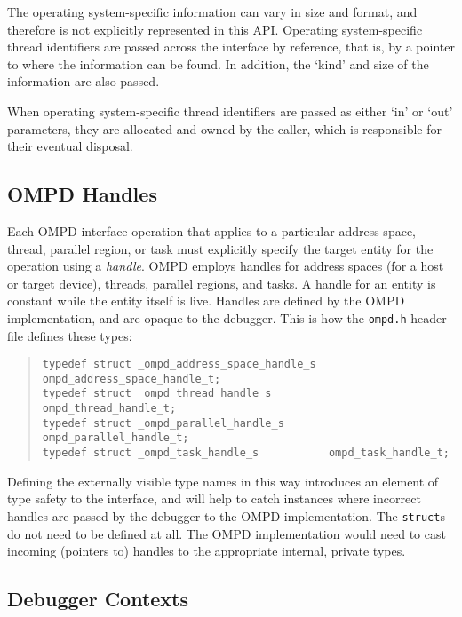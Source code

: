 The operating system-specific information can vary in size
and format, and therefore is not explicitly represented in this API.
Operating system-specific thread identifiers are passed
across the interface by reference, that is, by a pointer
to where the information can be found.
In addition, the `kind' and size of the information are
also passed.

When operating system-specific thread identifiers are
passed as either `in' or `out' parameters, they are
allocated and owned by the caller, which is responsible
for their eventual disposal.

\subsection{OMPD Handles}
\label{ompd-handles:sec}

Each OMPD interface operation that applies to a particular address space,
thread, parallel region, or task must  explicitly specify the target entity
for the operation using a \emph{handle}.
OMPD employs handles for address spaces (for a host or target device),
threads, parallel regions, and tasks.
A handle for an entity is constant while the entity itself is live.
Handles are defined by the OMPD implementation, and are opaque to the
debugger.
This is how the \texttt{ompd.h} header file defines these types:

\begin{quote}
\begin{lstlisting}
typedef struct _ompd_address_space_handle_s  ompd_address_space_handle_t;
typedef struct _ompd_thread_handle_s         ompd_thread_handle_t;
typedef struct _ompd_parallel_handle_s       ompd_parallel_handle_t;
typedef struct _ompd_task_handle_s           ompd_task_handle_t;
\end{lstlisting}
\end{quote}

Defining the externally visible type names in this way introduces
an element of type safety to the interface, and will help to catch
instances where incorrect handles are passed by the debugger
to the OMPD implementation.
The \texttt{struct}s do not need to be defined at all.
The OMPD implementation would need to cast incoming (pointers to)
handles to the appropriate internal, private types.

\subsection{Debugger Contexts}
\label{debugger-contexts:sec}

